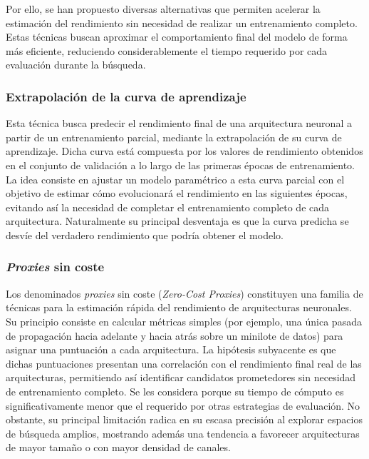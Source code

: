 Por ello, se han propuesto diversas alternativas que permiten acelerar la estimación del rendimiento sin necesidad de realizar un entrenamiento completo. Estas técnicas buscan aproximar el comportamiento final del modelo de forma más eficiente, reduciendo considerablemente el tiempo requerido por cada evaluación durante la búsqueda.

\subsubsection{Extrapolación de la curva de aprendizaje}
Esta técnica busca predecir el rendimiento final de una arquitectura neuronal a partir de un entrenamiento parcial, mediante la extrapolación de su curva de aprendizaje. Dicha curva está compuesta por los valores de rendimiento obtenidos en el conjunto de validación a lo largo de las primeras épocas de entrenamiento. La idea consiste en ajustar un modelo paramétrico a esta curva parcial con el objetivo de estimar cómo evolucionará el rendimiento en las siguientes épocas, evitando así la necesidad de completar el entrenamiento completo de cada arquitectura. Naturalmente su principal desventaja es que la curva predicha se desvíe del verdadero rendimiento que podría obtener el modelo.

\subsubsection{\textit{Proxies} sin coste}

Los denominados \textit{proxies} sin coste (\textit{Zero-Cost Proxies}) constituyen una familia de técnicas para la estimación rápida del rendimiento de arquitecturas neuronales. Su principio consiste en calcular métricas simples (por ejemplo, una única pasada de propagación hacia adelante y hacia atrás sobre un minilote de datos) para asignar una puntuación a cada arquitectura. La hipótesis subyacente es que dichas puntuaciones presentan una correlación con el rendimiento final real de las arquitecturas, permitiendo así identificar candidatos prometedores sin necesidad de entrenamiento completo. Se les considera  porque su tiempo de cómputo es significativamente menor que el requerido por otras estrategias de evaluación. No obstante, su principal limitación radica en su escasa precisión al explorar espacios de búsqueda amplios, mostrando además una tendencia a favorecer arquitecturas de mayor tamaño o con mayor densidad de canales.

